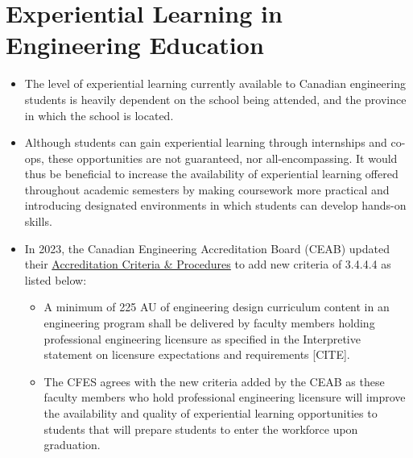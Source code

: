 \section{Experiential Learning in Engineering Education}\label{experiential-learning-in-engineering-education}



\begin{itemize}
 \item The level of experiential learning currently available to Canadian engineering students is heavily dependent on the school being attended, and the province in which the school is located.
 \item Although students can gain experiential learning through internships and co-ops, these opportunities are not guaranteed, nor all-encompassing. It would thus be beneficial to increase the availability of experiential learning offered throughout academic semesters by making coursework more practical and introducing designated environments in which students can develop hands-on skills.
 \item In 2023, the Canadian Engineering Accreditation Board (CEAB) updated their \href{https://engineerscanada.ca/sites/default/files/2023-12/Accreditation_Criteria_Procedures_2023.pdf}{Accreditation Criteria \& Procedures} to add new criteria of 3.4.4.4 as listed below:
 \begin{itemize}
  \item A minimum of 225 AU of engineering design curriculum content in an engineering program shall be delivered by faculty members holding professional engineering licensure as specified in the Interpretive statement on licensure expectations and requirements [CITE].
  \item The CFES agrees with the new criteria added by the CEAB as these faculty members who hold professional engineering licensure will improve the availability and quality of experiential learning opportunities to students that will prepare students to enter the workforce upon graduation.
 \end{itemize}
\end{itemize}


